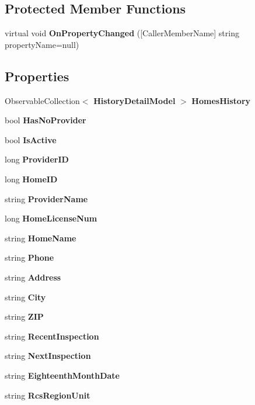 \subsection*{Protected Member Functions}
\begin{DoxyCompactItemize}
\item 
virtual void \textbf{ On\+Property\+Changed} ([Caller\+Member\+Name] string property\+Name=null)
\end{DoxyCompactItemize}
\subsection*{Properties}
\begin{DoxyCompactItemize}
\item 
Observable\+Collection$<$ \textbf{ History\+Detail\+Model} $>$ \textbf{ Homes\+History}\hspace{0.3cm}{\ttfamily  [get, set]}
\item 
bool \textbf{ Has\+No\+Provider}\hspace{0.3cm}{\ttfamily  [get, set]}
\item 
bool \textbf{ Is\+Active}\hspace{0.3cm}{\ttfamily  [get, set]}
\item 
long \textbf{ Provider\+ID}\hspace{0.3cm}{\ttfamily  [get, set]}
\item 
long \textbf{ Home\+ID}\hspace{0.3cm}{\ttfamily  [get, set]}
\item 
string \textbf{ Provider\+Name}\hspace{0.3cm}{\ttfamily  [get, set]}
\item 
long \textbf{ Home\+License\+Num}\hspace{0.3cm}{\ttfamily  [get, set]}
\item 
string \textbf{ Home\+Name}\hspace{0.3cm}{\ttfamily  [get, set]}
\item 
string \textbf{ Phone}\hspace{0.3cm}{\ttfamily  [get, set]}
\item 
string \textbf{ Address}\hspace{0.3cm}{\ttfamily  [get, set]}
\item 
string \textbf{ City}\hspace{0.3cm}{\ttfamily  [get, set]}
\item 
string \textbf{ Z\+IP}\hspace{0.3cm}{\ttfamily  [get, set]}
\item 
string \textbf{ Recent\+Inspection}\hspace{0.3cm}{\ttfamily  [get, set]}
\item 
string \textbf{ Next\+Inspection}\hspace{0.3cm}{\ttfamily  [get, set]}
\item 
string \textbf{ Eighteenth\+Month\+Date}\hspace{0.3cm}{\ttfamily  [get, set]}
\item 
string \textbf{ Rcs\+Region\+Unit}\hspace{0.3cm}{\ttfamily  [get, set]}
\end{DoxyCompactItemize}
